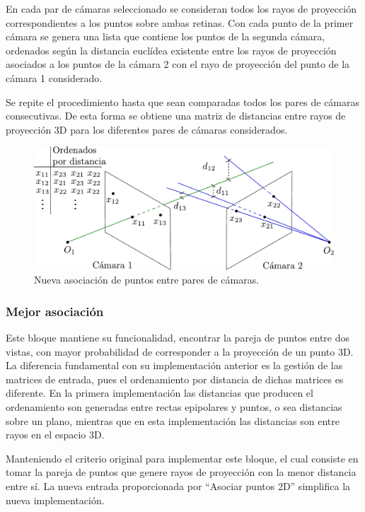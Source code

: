 En cada par de cámaras seleccionado se consideran todos los rayos de proyección correspondientes a los puntos sobre ambas retinas. Con  cada punto de la primer cámara se genera una lista que contiene los puntos de la segunda cámara, ordenados según  la distancia euclídea existente entre los rayos de proyección asociados a los puntos de la cámara 2  con el rayo de proyección del punto de la cámara 1 considerado. 


Se repite el procedimiento hasta que sean comparadas todos los pares de cámaras consecutivas. De esta forma se obtiene una matriz de distancias entre rayos de proyección 3D para los diferentes pares de cámaras considerados.

\begin{figure}[h!]
\centering
\captionsetup{justification=centering,margin=2.8cm}
\includegraphics[scale=0.7]{img/Reconstruccion/Asociar_puntos_2}
\caption{Nueva asociación de puntos entre pares de cámaras.}
\end{figure}
 
\subsubsection{Mejor asociación}


Este bloque mantiene su funcionalidad, encontrar la pareja de puntos entre dos vistas, con mayor probabilidad de corresponder a la proyección de un punto 3D.
La diferencia fundamental con su implementación anterior es la gestión de las matrices de entrada, pues el ordenamiento por distancia de dichas matrices es diferente. En la primera implementación las distancias que producen el ordenamiento son generadas entre rectas epipolares y puntos, o sea distancias sobre un plano, mientras que en esta implementación las distancias son entre rayos en el espacio 3D.


Manteniendo el criterio original para implementar este bloque, el cual consiste en tomar la pareja de puntos que genere rayos de proyección con la menor distancia entre sí. 
La nueva entrada proporcionada por “Asociar puntos 2D” simplifica la nueva implementación.


